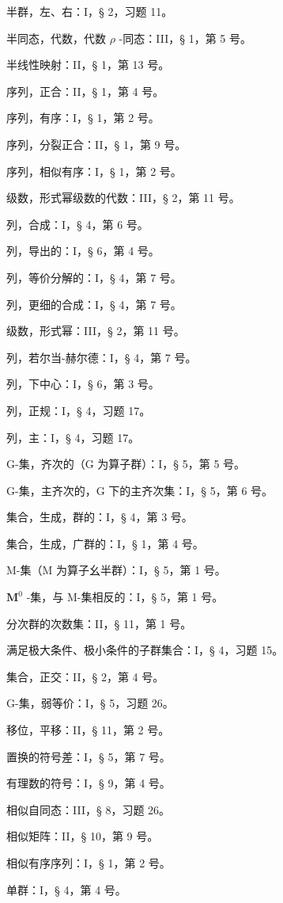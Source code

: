 半群，左、右：I，§ 2，习题 11。

半同态，代数，代数 \(\rho\) -同态：III，§ 1，第 5 号。

半线性映射：II，§ 1，第 13 号。

序列，正合：II，§ 1，第 4 号。

序列，有序：I，§ 1，第 2 号。

序列，分裂正合：II，§ 1，第 9 号。

序列，相似有序：I，§ 1，第 2 号。

级数，形式幂级数的代数：III，§ 2，第 11 号。

列，合成：I，§ 4，第 6 号。

列，导出的：I，§ 6，第 4 号。

列，等价分解的：I，§ 4，第 7 号。

列，更细的合成：I，§ 4，第 7 号。

级数，形式幂：III，§ 2，第 11 号。

列，若尔当-赫尔德：I，§ 4，第 7 号。

列，下中心：I，§ 6，第 3 号。

列，正规：I，§ 4，习题 17。

列，主：I，§ 4，习题 17。

G-集，齐次的（G 为算子群）：I，§ 5，第 5 号。

G-集，主齐次的，G 下的主齐次集：I，§ 5，第 6 号。

集合，生成，群的：I，§ 4，第 3 号。

集合，生成，广群的：I，§ 1，第 4 号。

M-集（M 为算子幺半群）：I，§ 5，第 1 号。

\(\mathbf{M}^0\) -集，与 M-集相反的：I，§ 5，第 1 号。

分次群的次数集：II，§ 11，第 1 号。

满足极大条件、极小条件的子群集合：I，§ 4，习题 15。

集合，正交：II，§ 2，第 4 号。

G-集，弱等价：I，§ 5，习题 26。

移位，平移：II，§ 11，第 2 号。

置换的符号差：I，§ 5，第 7 号。

有理数的符号：I，§ 9，第 4 号。

相似自同态：III，§ 8，习题 26。

相似矩阵：II，§ 10，第 9 号。

相似有序序列：I，§ 1，第 2 号。

单群：I，§ 4，第 4 号。

